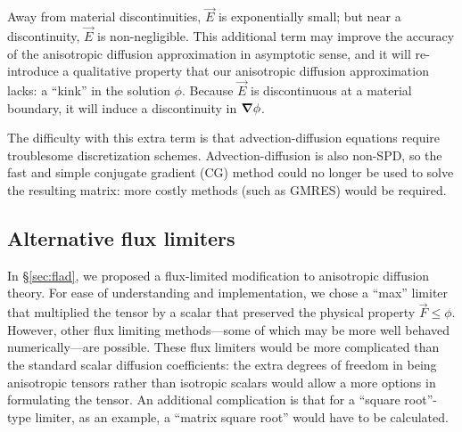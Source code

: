 Away from material discontinuities, $\vec{E}$ is exponentially small; but
near a discontinuity, $\vec{E}$ is non-negligible. This additional term may
improve the accuracy of the anisotropic diffusion approximation in asymptotic
sense, and it will re-introduce a qualitative property that our anisotropic
diffusion approximation lacks: a ``kink'' in the solution $\phi$. Because
$\vec{E}$ is discontinuous at a material boundary, it will induce a
discontinuity in $\bm{\nabla} \phi$.

The difficulty with this extra term is that advection-diffusion equations
require troublesome discretization schemes. Advection-diffusion is also non-SPD,
so the fast and simple conjugate gradient (CG) method could no longer be used to
solve the resulting matrix: more costly methods (such as GMRES) would be
required.

\subsection{Alternative flux limiters}

In \S\ref{sec:flad}, we proposed a flux-limited modification to anisotropic
diffusion theory. For ease of understanding and implementation, we chose a
``max'' limiter that multiplied the tensor by a scalar that preserved the
physical property $\vec{F} \le \phi$. However, other flux limiting
methods---some of which may be more well behaved numerically---are possible.
These flux limiters would be more complicated than the standard scalar diffusion
coefficients: the extra degrees of freedom in being anisotropic tensors rather
than isotropic scalars would allow a more options in formulating the tensor.
An additional complication is that for a ``square root''-type limiter, as an
example, a ``matrix square root'' would have to be calculated.

